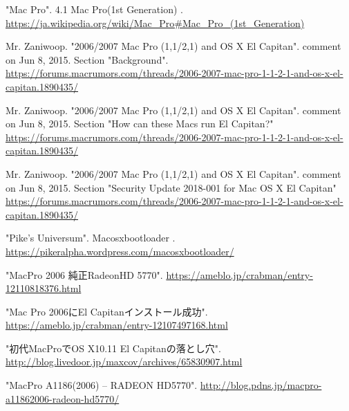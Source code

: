\documentclass{jsarticle}
\begin{document}
\begin{thebibliography}{9}

  "Mac Pro". 4.1 Mac Pro(1st Generation) .
  \url{https://ja.wikipedia.org/wiki/Mac_Pro#Mac_Pro_(1st_Generation)}

  Mr. Zaniwoop. "2006/2007 Mac Pro (1,1/2,1) and OS X El Capitan". comment on Jun 8, 2015. Section "Background". 
  \url{https://forums.macrumors.com/threads/2006-2007-mac-pro-1-1-2-1-and-os-x-el-capitan.1890435/}

  Mr. Zaniwoop. "2006/2007 Mac Pro (1,1/2,1) and OS X El Capitan". comment on Jun 8, 2015. Section "How can these Macs run El Capitan?" 
  \url{https://forums.macrumors.com/threads/2006-2007-mac-pro-1-1-2-1-and-os-x-el-capitan.1890435/}


  Mr. Zaniwoop. "2006/2007 Mac Pro (1,1/2,1) and OS X El Capitan". comment on Jun 8, 2015. Section "Security Update 2018-001 for Mac OS X El Capitan" 
  \url{https://forums.macrumors.com/threads/2006-2007-mac-pro-1-1-2-1-and-os-x-el-capitan.1890435/}


  "Pike's Universum". Macosxbootloader .
  \url{https://pikeralpha.wordpress.com/macosxbootloader/}

  "MacPro 2006 純正RadeonHD 5770". 
  \url{https://ameblo.jp/crabman/entry-12110818376.html}

  "Mac Pro 2006にEl Capitanインストール成功". 
  \url{https://ameblo.jp/crabman/entry-12107497168.html}

  "初代MacProでOS X10.11 El Capitanの落とし穴". 
  \url{http://blog.livedoor.jp/maxcov/archives/65830907.html}

  "MacPro A1186(2006) – RADEON HD5770". 
  \url{http://blog.pdns.jp/macpro-a11862006-radeon-hd5770/}


\end{thebibliography}
\end{document}
